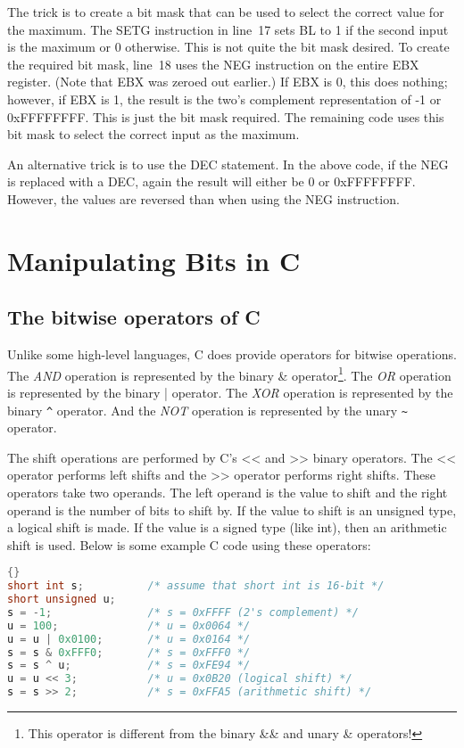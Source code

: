 

The trick is to create a bit mask that can be used to select the
correct value for the maximum. The {\code SETG}
instruction in line~17 sets BL to 1 if the second input is the maximum
or 0 otherwise. This is not quite the bit mask desired. To create the
required bit mask, line~18 uses the {\code NEG} instruction
on the entire EBX register. (Note that EBX was zeroed out earlier.)
If EBX is 0, this does nothing; however, if EBX is 1, the result is
the two's complement representation of -1 or 0xFFFFFFFF. This is just
the bit mask required. The remaining code uses this bit mask to select
the correct input as the maximum.

An alternative trick is to use the {\code DEC} statement. In the above
code, if the {\code NEG} is replaced with a {\code DEC}, again the result
will either be 0 or 0xFFFFFFFF. However, the values are reversed than
when using the {\code NEG} instruction.


\section{Manipulating Bits in C}

\subsection{The bitwise operators of C}

Unlike some high-level languages, C does provide operators for bitwise
operations. The \emph{AND} operation is represented by the binary
{\code \&} operator\footnote{This operator is different from the
binary {\code \&\&} and unary {\code \&} operators!}. The \emph{OR}
operation is represented by the binary {\code |} operator. The
\emph{XOR} operation is represented by the binary {\code \verb|^| 
}operator. And the \emph{NOT} operation is represented by the unary
{\code \verb|~| }operator.

The shift operations are performed by C's {\code <<} and {\code >>}
binary operators. The {\code <<} operator performs left shifts and the 
{\code >>} operator performs right shifts. These operators take two
operands. The left operand is the value to shift and the right operand is
the number of bits to shift by. If the value to shift is an unsigned type,
a logical shift is made. If the value is a signed type (like {\code int}),
then an arithmetic shift is used. Below is some example C code using these
operators:
\begin{lstlisting}[language=C]{}
short int s;          /* assume that short int is 16-bit */
short unsigned u;
s = -1;               /* s = 0xFFFF (2's complement) */
u = 100;              /* u = 0x0064 */
u = u | 0x0100;       /* u = 0x0164 */
s = s & 0xFFF0;       /* s = 0xFFF0 */
s = s ^ u;            /* s = 0xFE94 */
u = u << 3;           /* u = 0x0B20 (logical shift) */
s = s >> 2;           /* s = 0xFFA5 (arithmetic shift) */
\end{lstlisting}

